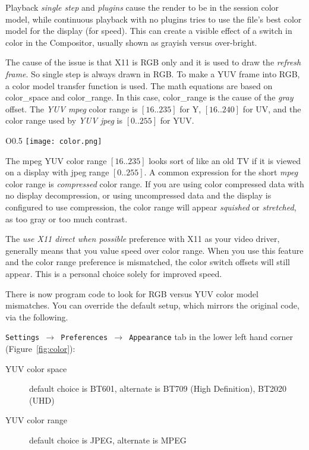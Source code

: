 Playback \textit{single step} and \textit{plugins} cause the render to be in the session color model, while continuous playback with no plugins tries to use the file’s best color model for the display (for speed).
This can create a visible effect of a switch in color in the Compositor, usually shown as grayish versus over-bright.

The cause of the issue is that X11 is RGB only and it is used to draw the \textit{refresh frame}.  So single step is always drawn in RGB.  To make a YUV frame into RGB, a color model transfer function is used.  The math equations are based on color\_space and color\_range.  In this case, color\_range is the cause of the \textit{gray} offset.  The \textit{YUV mpeg} color range is $[16..235]$ for Y, $[16..240]$ for UV, and the color range used by \textit{YUV jpeg} is $[0..255]$ for YUV.

\begin{wrapfigure}[11]{O}{0.5\textwidth} 
    \vspace{-2ex}
    \centering
    \texttt{[image: color.png]}
    \caption{Color space and Color range}
    \label{fig:color}
\end{wrapfigure} 

The mpeg YUV color range $[16..235]$ looks sort of like an old TV if it is viewed on a display with jpeg range $[0..255]$.  A common expression for the short \textit{mpeg} color range is \textit{compressed} color range.  If you are using color compressed data with no display decompression, or using uncompressed data and the display is configured to use compression, the color range will appear \textit{squished} or \textit{stretched}, as too gray or too much contrast.

The \textit{use X11 direct when possible} preference with X11 as your video driver, generally means that you value speed over color range.  When you use this feature and the color range preference is mismatched, the color switch offsets will still appear.  This is a personal choice solely for improved speed.

There is now program code to look for RGB versus YUV color model mismatches.  You can override the default setup, which mirrors the original code, via the following.

\texttt{Settings $\rightarrow$ Preferences $\rightarrow$ Appearance} tab in the lower left hand corner (Figure~\ref{fig:color}):

\begin{description}
    \item[YUV color space] default choice is BT601, alternate is BT709 (High Definition), BT2020 (UHD)
    \item[YUV color range] default choice is JPEG,   alternate is MPEG
\end{description}

